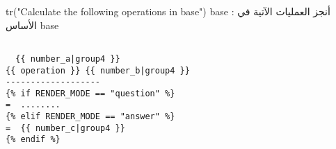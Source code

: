 {{ tr("Calculate  the following operations in base")}} {{ base }} :  أنجز العمليات الآتية في الأساس {{ base }}

\begin{verbatim}

  {{ number_a|group4 }}
{{ operation }} {{ number_b|group4 }}
-------------------
{% if RENDER_MODE == "question" %}
=  ........
{% elif RENDER_MODE == "answer" %}
=  {{ number_c|group4 }}
{% endif %}

\end{verbatim}
